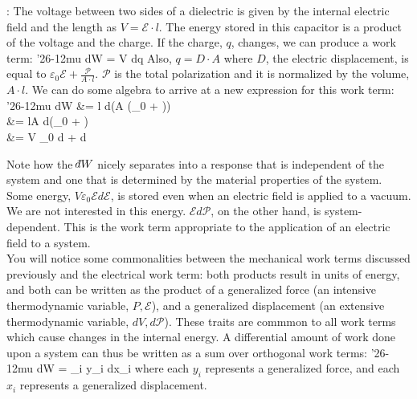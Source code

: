 \documentclass[12pt]{article}
\def\dbar{{\mathchar'26\mkern-12mu d}}
\begin{document}
: The voltage between two sides of a dielectric is given by the internal electric field and the length as $V = \mathcal{E} \cdot l$.  The energy stored in this capacitor is a product of the voltage and the charge.  If the charge, $q$, changes, we can produce a work term:
\eqs
\dbar W = V dq
\eqe
Also, $q=D \cdot A$ where $D$, the electric displacement, is equal to $\varepsilon_0 \mathcal{E} + \frac{\mathcal{P}}{A\cdot l}$.  $\mathcal{P}$ is the total polarization and it is normalized by the volume, $A\cdot l$. We can do some algebra to arrive at a new expression for this work term:
\eqs
\dbar W &=  l  \cdot d(A (\varepsilon_0  + ))\\
&= lA \cdot d(\varepsilon_0  + )\\
&= V \varepsilon_0  d +  d
\eqe

Note how the $\dbar W$ nicely separates into a response that is independent of the system and one that is determined by the material properties of the system. Some energy, $V \varepsilon_0 \mathcal{E} d\mathcal{E}$, is stored even when an electric field is applied to a vacuum. We are not interested in this energy. $\mathcal{E} d\mathcal{P}$, on the other hand, is system-dependent. This is the work term appropriate to the application of an electric field to a system. \\%

You will notice some commonalities between the mechanical work terms discussed previously and the electrical work term: both products result in units of energy, and both can be written as the product of a generalized force (an intensive thermodynamic variable, $P,\mathcal{E}$), and a generalized displacement (an extensive thermodynamic variable, $dV,d\mathcal{P}$). These traits are commmon to all work terms which cause changes in the internal energy. A differential amount of work done upon a system can thus be written as a sum over orthogonal work terms:
\eqs
\dbar W = \sum_i y_i dx_i
\eqe
where each $y_i$ represents a generalized force, and each $x_i$ represents a generalized displacement.
\end{document}
